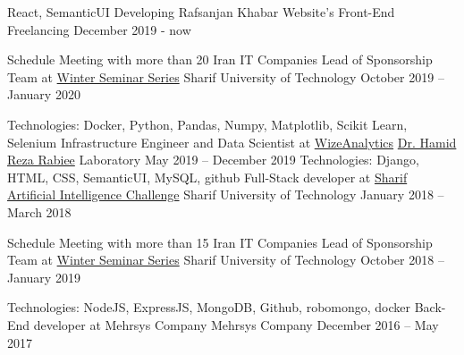 
\begin{cventries}
	
  \cventry
  	{React, SemanticUI}
  	{Developing Rafsanjan Khabar Website's Front-End}
  	{Freelancing}
	{December 2019 - now}
	{}
	
  \cventry
	{Schedule Meeting with more than 20 Iran IT Companies}
	{Lead of Sponsorship Team at \href{https://wss.ce.sharif.edu/2019/staff/}{Winter Seminar Series}}
	{Sharif University of Technology}
	{October 2019 – January 2020}
	{}
	
  \cventry
	{Technologies: Docker, Python, Pandas, Numpy, Matplotlib, Scikit Learn, Selenium}
	{Infrastructure Engineer and Data Scientist at \href{http://wizeanalytics.com/}{WizeAnalytics}}
	{\href{http://sharif.edu/~rabiee/}{Dr. Hamid Reza Rabiee} Laboratory}
	{May 2019 – December 2019}
	{}
  \cventry
    {Technologies: Django, HTML, CSS, SemanticUI, MySQL, github}
    {Full-Stack developer at \href{https://aichallenge.sharif.edu/}{Sharif Artificial Intelligence Challenge}}
    {Sharif University of Technology}
    {January 2018 – March 2018}
    {}
    
      \cventry
    {Schedule Meeting with more than 15 Iran IT Companies}
    {Lead of Sponsorship Team at \href{https://wss.ce.sharif.edu/2018/staff/}{Winter Seminar Series}}
    {Sharif University of Technology}
    {October 2018 – January 2019}
    {}
    
  \cventry
    {Technologies: NodeJS, ExpressJS, MongoDB, Github, robomongo, docker}
    {Back-End developer at Mehrsys Company}
    {Mehrsys Company}
    {December 2016 – May 2017}
    {}
    
  
\end{cventries}
